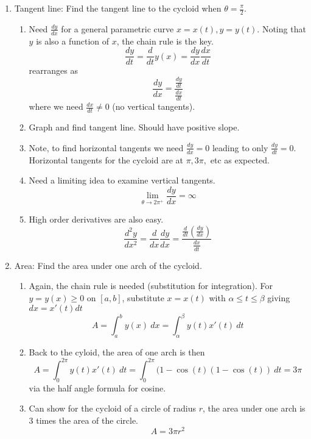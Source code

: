 \documentclass{article}
\begin{document}
\begin{enumerate}
\item Tangent line: Find the tangent line to the cycloid when $\theta=\frac{\pi}{2}$. 
\begin{enumerate}
\item Need $\frac{dy}{dx}$ for a general parametric curve $x=x(t), y=y(t)$. Noting that $y$ is also a function of $x$, the chain rule is the key.
\[
\frac{dy}{dt} = \frac{d}{dt} y(x) = \frac{dy}{dx} \frac{dx}{dt}
\]
rearranges as
\[
\frac{dy}{dx} = \frac{\frac{dy}{dt}}{\frac{dx}{dt}}
\]
where we need $\frac{dx}{dt} \neq 0$ (no vertical tangents).
\item Graph and find tangent line. Should have positive slope.
\item Note, to find horizontal tangents we need $\frac{dy}{dx}=0$ leading to only $\frac{dy}{dt}=0$. Horizontal tangents for the cycloid are at $\pi, 3\pi, $ etc as expected.
\item Need a limiting idea to examine vertical tangents.
\[
\lim_{\theta \rightarrow 2\pi^+} \frac{dy}{dx} = \infty
\]
\item High order derivatives are also easy.
\[
\frac{d^2y}{dx^2} = \frac{d}{dx} \frac{dy}{dx} = \frac{\frac{d}{dt} \left( \frac{dy}{dx} \right)}{\frac{dx}{dt}}
\]
\end{enumerate}

\item Area: Find the area under one arch of the cycloid.
\begin{enumerate}
\item Again, the chain rule is needed (substitution for integration). For $y=y(x)\geq 0$ on $[a,b]$, substitute $x=x(t)$ with $\alpha \leq t \leq \beta$ giving $dx = x'(t)dt$
\[
A = \int_a^b y(x)~dx = \int_{\alpha}^{\beta} y(t) x'(t)~dt
\]
\item Back to the cyloid, the area of one arch is then
\[
A = \int_0^{2\pi} y(t)x'(t)~dt = \int_0^{2\pi} (1-\cos(t)(1-\cos(t))~dt = 3\pi 
\]
via the half angle formula for cosine.
\item Can show for the cycloid of a circle of radius $r$, the area under one arch is 3 times the area of the circle. 
\[
A = 3\pi r^2
\]

\end{enumerate}


\end{enumerate}
\end{document}
